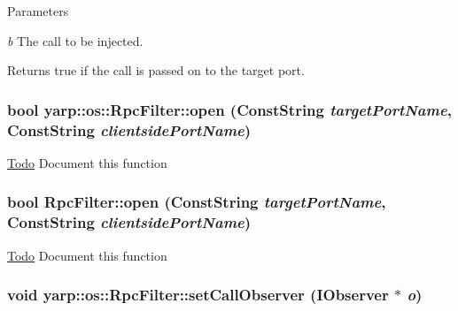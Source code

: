 \begin{DoxyParams}{Parameters}
\item[{\em b}]The call to be injected. \end{DoxyParams}
\begin{DoxyReturn}{Returns}
{\ttfamily true} if the call is passed on to the target port. 
\end{DoxyReturn}
\hypertarget{classyarp_1_1os_1_1_rpc_filter_a5e5998e39055ac1d5fd9556e2a784478}{
\subsubsection[{open}]{\setlength{\rightskip}{0pt plus 5cm}bool yarp::os::RpcFilter::open (ConstString {\em targetPortName}, \/  ConstString {\em clientsidePortName})}}
\label{classyarp_1_1os_1_1_rpc_filter_a5e5998e39055ac1d5fd9556e2a784478}
\begin{Desc}
\item[\hyperlink{todo__todo000018}{Todo}]Document this function \end{Desc}
\hypertarget{classyarp_1_1os_1_1_rpc_filter_adeb2b65f313a9ef7986244d81fdab354}{
\subsubsection[{open}]{\setlength{\rightskip}{0pt plus 5cm}bool RpcFilter::open (ConstString {\em targetPortName}, \/  ConstString {\em clientsidePortName})}}
\label{classyarp_1_1os_1_1_rpc_filter_adeb2b65f313a9ef7986244d81fdab354}
\begin{Desc}
\item[\hyperlink{todo__todo000008}{Todo}]Document this function \end{Desc}
\hypertarget{classyarp_1_1os_1_1_rpc_filter_a53a5895db837b1e21cfa42fb26a3d653}{
\subsubsection[{setCallObserver}]{\setlength{\rightskip}{0pt plus 5cm}void yarp::os::RpcFilter::setCallObserver ({\bf IObserver} $\ast$ {\em o})}}
\label{classyarp_1_1os_1_1_rpc_filter_a53a5895db837b1e21cfa42fb26a3d653}
